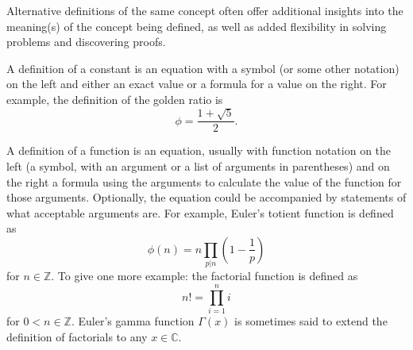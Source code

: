 \documentclass[12pt]{article}
\begin{document}
 Alternative definitions of the same concept often offer additional insights into the meaning(s) of the concept being defined, as well as added flexibility in solving problems and discovering proofs.

A definition of a constant is an equation with a symbol (or some other notation) on the left and either an exact value or a formula for a value on the right. For example, the definition of the golden ratio is $$\phi = \frac{1 + \sqrt{5}}{2}.$$

A definition of a function is an equation, usually with function notation on the left (a symbol, with an argument or a list of arguments in parentheses) and on the right a formula using the arguments to calculate the value of the function for those arguments. Optionally, the equation could be accompanied by statements of what acceptable arguments are. For example, Euler's totient function is defined as $$\phi (n) = n \prod_{p|n} \left( 1- \frac{1}{p} \right)$$ for $n \in \mathbb{Z}$. To give one more example: the factorial function is defined as $$n! = \prod_{i = 1}^n i$$ for $0 < n \in \mathbb{Z}$. Euler's gamma function $\Gamma(x)$ is sometimes said to extend the definition of factorials to any $x \in \mathbb{C}$.

\end{document}
